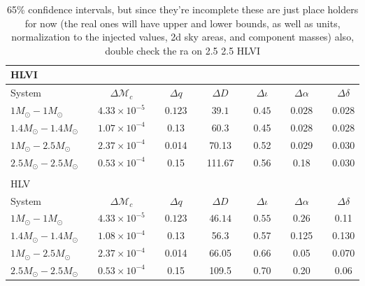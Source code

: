 \documentclass[11pt,a4paper]{emulateapj}
\newcommand{\carl}[1]{{\color{red}  #1}}
\begin{document}
\begin{table}[t!]
\centering
\caption{\carl{65\% confidence intervals, but since they're incomplete these are just place holders for now (the real ones will have upper and lower bounds, as well as units, normalization to the injected values, 2d sky areas, and component masses) also, double check the ra on 2.5 2.5 HLVI}}
\begin{tabular}{lcccccccccccc}

\\HLVI\\
\hline\hline
System & \vline &  $\Delta \mathcal{M}_c$ & \vline & $\Delta q$ & \vline & $\Delta D$ & \vline & $\Delta \iota$ & \vline & $\Delta \alpha$ & \vline &  $\Delta \delta$\\
\hline\hline
$1M_{\odot}-1M_{\odot}$ & \vline & $4.33\times10^{-5}$ & \vline & $0.123$& \vline & $39.1$ & \vline & $0.45$ & \vline & $0.028$ & \vline & 0.028\\
\hline
$1.4M_{\odot}-1.4M_{\odot}$ & \vline & $1.07\times10^{-4}$ & \vline & 0.13 & \vline & 60.3 & \vline & 0.45 & \vline & 0.028 & \vline & 0.028\\
\hline
$1M_{\odot}-2.5M_{\odot}$ & \vline & $2.37\times10^{-4}$ & \vline & 0.014 & \vline & 70.13 & \vline & 0.52 & \vline & 0.029 & \vline &0.030\\
\hline
$2.5M_{\odot}-2.5M_{\odot}$ & \vline & $0.53\times10^{-4}$ & \vline & 0.15 & \vline & 111.67 & \vline & 0.56 & \vline & 0.18 & \vline & 0.030 \\
\hline\hline

\\
HLV\\

\hline\hline
System & \vline &  $\Delta \mathcal{M}_c$ & \vline & $\Delta q$ & \vline & $\Delta D$ & \vline & $\Delta \iota$ & \vline & $\Delta \alpha$ & \vline &  $\Delta \delta$\\
\hline\hline
$1M_{\odot}-1M_{\odot}$ & \vline & $4.33\times10^{-5}$ & \vline & $0.123$& \vline & $46.14$ & \vline & $0.55$ & \vline & $0.26$ & \vline & 0.11\\
\hline
$1.4M_{\odot}-1.4M_{\odot}$ & \vline & $1.08\times10^{-4}$ & \vline & 0.13 & \vline & 56.3 & \vline & 0.57 & \vline & 0.125 & \vline & 0.130\\
\hline
$1M_{\odot}-2.5M_{\odot}$ & \vline & $2.37\times10^{-4}$ & \vline & 0.014 & \vline & 66.05 & \vline & 0.66 & \vline & 0.05 & \vline &0.070\\
\hline
$2.5M_{\odot}-2.5M_{\odot}$ & \vline & $0.53\times10^{-4}$ & \vline & 0.15 & \vline & 109.5 & \vline & 0.70 & \vline & 0.20 & \vline & 0.06 \\
\hline\hline


\end{tabular}
\label{ciTable}
\end{table}
\end{document}
